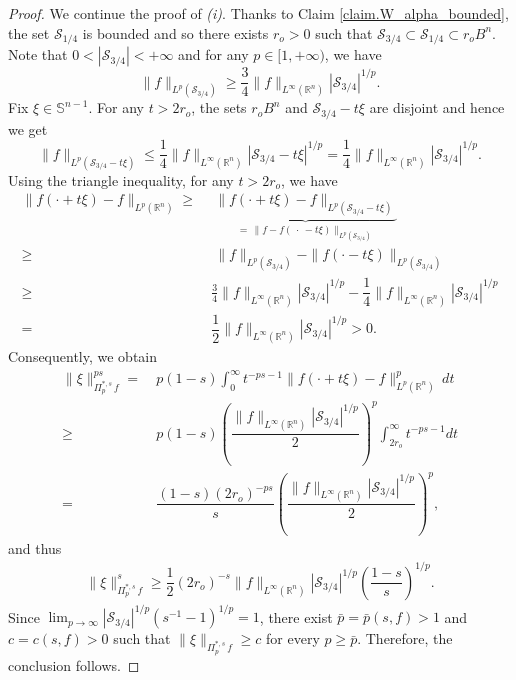 \documentclass[10pt,a4paper]{amsart}
\newcommand{\R}{\mathbb{R}}
\newcommand{\Sphere}{\mathbb{S}^{n - 1}}
\newcommand{\Sset}{\mathscr S}
\begin{document}
\begin{proof}
	We continue the proof of \textit{(i)}.
    Thanks to Claim \ref{claim.W_alpha_bounded}, the set $\Sset_{1/4}$ is bounded and so there exists $r_o > 0$ such that $\Sset_{3/4} \subset \Sset_{1/4} \subset r_o B^n$.
	Note that $0 < |\Sset_{3/4}| < + \infty$ and for any $p \in [1, + \infty)$, we have 
	\[
	\| f \|_{L^p(\Sset_{3/4})} \geq \frac{3}{4} \| f \|_{L^\infty(\R^n)} |\Sset_{3/4}|^{1/p}.
	\]
	Fix $\xi \in \Sphere$.
    For any $t > 2r_o$, the sets $r_oB^n$ and $\Sset_{3/4} - t\xi$ are disjoint and hence we get 
    \[
    	\| f \|_{L^p(\Sset_{3/4} - t \xi)} \leq \dfrac{1}{4} \| f \|_{L^\infty(\R^n)} |\Sset_{3/4} - t\xi|^{1/p} = \dfrac{1}{4} \| f \|_{L^\infty(\R^n)} |\Sset_{3/4}|^{1/p}.
    \]
    Using the triangle inequality, for any $t > 2r_o$, we have
    \begin{equation}\label{differ-Lp}
    	\begin{split}
    	\| f(\cdot + t \xi) - f \|_{L^p(\R^n)} 
    	\geq &  ~ 
    	~ \underbrace{\| f(\cdot + t \xi) - f \|_{L^p(\Sset_{3/4} - t\xi)}}_{= \, \| f   - f(~\cdot ~- t \xi) \|_{L^p(\Sset_{3/4})}} \\
    	\geq & ~ 
    	~ \| f \|_{L^p(\Sset_{3/4})} - \| f (\cdot - t \xi) \|_{L^p(\Sset_{3/4})} \\
    	\geq & ~
	\frac{3}{4} \| f \|_{L^\infty(\R^n)} |\Sset_{3/4}|^{1/p} - \dfrac{1}{4} \| f \|_{L^\infty(\R^n)} |\Sset_{3/4}|^{1/p} \\
    = & ~  \dfrac{1}{2}\| f \|_{L^\infty(\R^n)} |\Sset_{3/4}|^{1/p} > 0.
    	\end{split}
    \end{equation}
    Consequently, we obtain
    \begin{align*}
    	 \| \xi \|^{ps}_{\Pi^{\ast, s}_p \, f} 
         = & ~  p(1 - s) \int_0^\infty t^{-ps - 1} \| f(\cdot + t\xi) - f \|^p_{L^p(\R^n)} \, dt \\
    	 \geq & 
    	 ~ p(1 - s) \left( \dfrac{\| f \|_{L^\infty(\R^n)} |\Sset_{3/4}|^{1/p}}{2}  \right)^p \int_{2r_o}^\infty t^{-ps - 1}dt \\
    	 = & 
    	 ~ \dfrac{(1 - s)(2r_o)^{-ps}}{s}  \left( \dfrac{\| f \|_{L^\infty(\R^n)} |\Sset_{3/4}|^{1/p}}{2}  \right)^p,
    \end{align*}
   	and thus
   	\begin{align*}
   		\| \xi \|^{s}_{\Pi^{\ast, s}_p \, f} \geq \dfrac{1}{2} (2r_o)^{-s}\| f \|_{L^\infty(\R^n)} |\Sset_{3/4}|^{1/p} \left( \dfrac{1 - s}{s} \right)^{1/p}.
   	\end{align*}
 Since $\textstyle\lim_{p \to \infty} |\Sset_{3/4}|^{1/p}(s^{-1} - 1)^{1/p} = 1$, there exist $\bar p  = \bar p(s, f) > 1$ and $c = c(s, f) > 0$ such that $\| \xi \|_{\Pi^{\ast, s}_p \, f} \geq c$ for every $p \geq \bar p$. 
 Therefore, the conclusion follows.
   

\end{proof}
\end{document}
